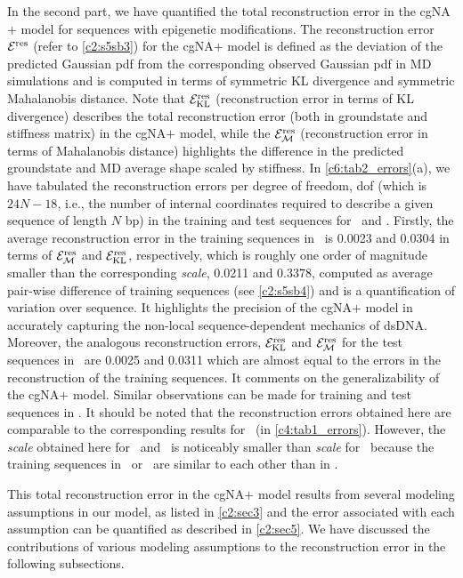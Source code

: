 In the second part, we have quantified the total reconstruction error in the cgNA$+$ model for sequences with epigenetic modifications.
The reconstruction error ${\mathcal E}^{\text{res}}$ (refer to \cref{c2:s5sb3}) for the cgNA$+$ model is defined as the deviation of the predicted Gaussian pdf from the corresponding observed Gaussian pdf in MD simulations and is computed in terms of symmetric KL divergence and symmetric Mahalanobis distance. 
Note that ${\mathcal E}_{\text{KL}}^{\text{res}}$ (reconstruction error in terms of KL divergence) describes the total reconstruction error (both in groundstate and stiffness matrix) in the cgNA$+$ model, while the ${\mathcal E}_{\mathcal{M}}^{\text{res}}$ (reconstruction error in terms of Mahalanobis distance) highlights the difference in the predicted groundstate and MD average shape scaled by stiffness.
In \cref{c6:tab2_errors}(a), we have tabulated the reconstruction errors per degree of freedom, dof (which is $24N-18$, i.e., the number of internal coordinates required to describe a given sequence of length $N$ bp) in the training and test sequences for \Lbm \ and \Lbh.
Firstly, the average reconstruction error in the training sequences in \Lbm \ is 0.0023 and 0.0304 in terms of ${\mathcal E}_{\mathcal{M}}^{\text{res}}$ and ${\mathcal E}_{\text{KL}}^{\text{res}}$, respectively, which is roughly one order of magnitude smaller than the corresponding \textit{scale}, 0.0211 and 0.3378, computed as average pair-wise difference of training sequences (see \cref{c2:s5sb4}) and is a quantification of variation over sequence.
It highlights the precision of the cgNA$+$ model in accurately capturing the non-local sequence-dependent mechanics of dsDNA.
Moreover, the analogous reconstruction errors, ${\mathcal E}_{\text{KL}}^{\text{res}}$ and ${\mathcal E}_{\mathcal{M}}^{\text{res}}$ for the test sequences in \Lbm \ are 0.0025 and 0.0311 which are almost equal to the errors in the reconstruction of the training sequences. 
It comments on the generalizability of the cgNA$+$ model. 
Similar observations can be made for training and test sequences in \Lbh. 
It should be noted that the reconstruction errors obtained here are comparable to the corresponding results for \Lbdna \ (in \cref{c4:tab1_errors}). 
However, the \textit{scale} obtained here for \Lbh \ and \Lbm \ is noticeably smaller than \textit{scale} for \Lbdna \ because the training sequences in \Lbh \ or \Lbm \ are similar to each other than in \Lbdna.

This total reconstruction error in the cgNA$+$ model results from several modeling assumptions in our model, as listed in \cref{c2:sec3} and the error associated with each assumption can be quantified as described in \cref{c2:sec5}.
We have discussed the contributions of various modeling assumptions to the reconstruction error in the following subsections.

